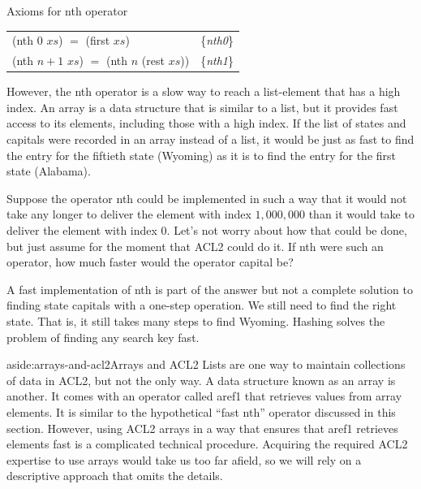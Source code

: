 \begin{center}
Axioms for \textsf{nth} operator
\begin{tabular}{ll}
\textsf{(nth 0} $xs$\textsf{)} $=$ \textsf{(first} $xs$\textsf{)}  & \{\emph{nth0}\}             \\
\textsf{(nth} $n+1$ $xs$\textsf{)} $=$ \textsf{(nth} $n$ \textsf{(rest} $xs$\textsf{))} & \{\emph{nth1}\} \\
\end{tabular}
\end{center}

However, the \textsf{nth} operator is a slow way to reach a
list-element that has a high index.
An array is a data structure that is
similar to a list, but it provides fast access to its
elements, including those with a high index.
If the list of states and capitals were recorded in an array instead
of a list, it would be just as fast to find the entry for the
fiftieth state (Wyoming) as it is to find the entry
for the first state (Alabama).

Suppose the operator \textsf{nth} could be implemented
in such a way that it would not take any longer to
deliver the element with index $1{,}000{,}000$ than it would take
to deliver the element with index $0$.
Let's not worry about how that could be done, but %
just assume for the moment that ACL2 could do it.
If \textsf{nth} were such an operator,
how much faster would the operator \textsf{capital} be?

A fast implementation of \textsf{nth} is part of the answer
but not a complete solution to finding state capitals
with a one-step operation.
We still need to find the right state.
That is, it still takes many steps to find Wyoming.
Hashing solves the problem of finding any search key fast.

\begin{aside}{aside:arrays-and-acl2}{Arrays and ACL2}
Lists are one way to maintain collections of data in ACL2,
but not the only way. A data structure
known as an array is another. It comes with an operator
called \textsf{aref1} that retrieves values from array elements.
It is similar to the hypothetical ``fast \textsf{nth}'' operator
discussed in this section. However, using ACL2 arrays in a way that
ensures that \textsf{aref1} retrieves elements fast
is a complicated technical procedure.
Acquiring the required ACL2 expertise to use arrays
would take us too far afield, so we will rely on a
descriptive approach that omits the details.
\end{aside}

